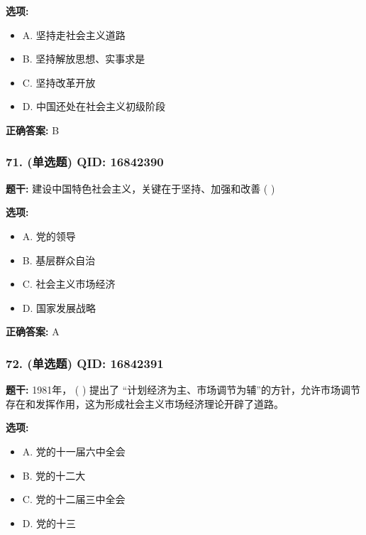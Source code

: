 \documentclass[12pt,UTF8]{ctexart}
\begin{document}
\textbf{选项:}
\begin{itemize}[leftmargin=*]

  \item A. 坚持走社会主义道路

  \item B. 坚持解放思想、实事求是

  \item C. 坚持改革开放

  \item D. 中国还处在社会主义初级阶段

\end{itemize}

\textbf{正确答案:}
B

\vspace{0.3em}\hrulefill\vspace{0.7em}

\subsubsection*{71. (单选题) \small QID: 16842390}

\textbf{题干:}
建设中国特色社会主义，关键在于坚持、加强和改善 ( )

\textbf{选项:}
\begin{itemize}[leftmargin=*]

  \item A. 党的领导

  \item B. 基层群众自治

  \item C. 社会主义市场经济

  \item D. 国家发展战略

\end{itemize}

\textbf{正确答案:}
A

\vspace{0.3em}\hrulefill\vspace{0.7em}

\subsubsection*{72. (单选题) \small QID: 16842391}

\textbf{题干:}
1981年， ( ) 提出了 “计划经济为主、市场调节为辅”的方针，允许市场调节存在和发挥作用，这为形成社会主义市场经济理论开辟了道路。

\textbf{选项:}
\begin{itemize}[leftmargin=*]

  \item A. 党的十一届六中全会

  \item B. 党的十二大

  \item C. 党的十二届三中全会

  \item D. 党的十三

\end{itemize}
\end{document}
